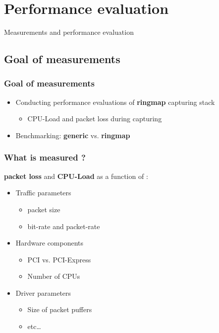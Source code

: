 \documentclass{beamer}
\begin{document}
\section{Performance evaluation}
\begin{frame}
	\begin{center}
	\huge{Measurements and performance evaluation}
	\end{center}
\end{frame}

\subsection*{Goal of measurements}

\begin{frame}
\frametitle{Goal of measurements}
\begin{itemize}
	\item Conducting performance evaluations of \textbf{ringmap} capturing stack
		\begin{itemize}
			\item CPU-Load and packet loss during capturing\newline
		\end{itemize}
	\item Benchmarking: \textbf{generic} vs. \textbf{ringmap}
\end{itemize}
\end{frame}

\begin{frame}
\frametitle{What is measured ?}
\textbf{packet loss} and \textbf{CPU-Load} as a function of :\newline
\begin{itemize}
	\item Traffic parameters
		\begin{itemize}
			\item packet size
			\item bit-rate and packet-rate
		\end{itemize}

\color{gray}
	\item  Hardware components
		\begin{itemize}
\color{gray}
			\item PCI vs. PCI-Express
			\item Number of CPUs
		\end{itemize}
	\item Driver parameters
		\begin{itemize}
\color{gray}
			\item Size of packet puffers 
			\item etc\ldots
		\end{itemize}
\end{itemize}
\normalcolor
\end{frame}
\end{document}
